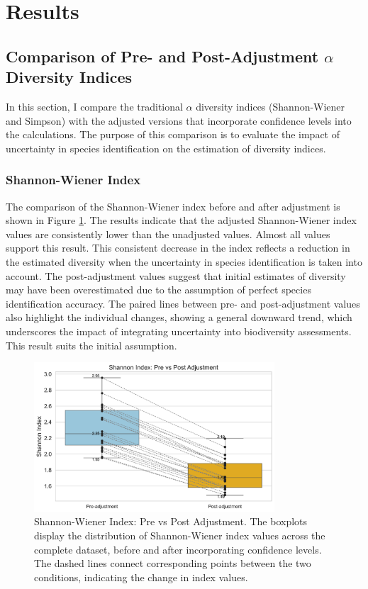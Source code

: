 \documentclass[a4paper,12pt]{article}
\begin{document}
\section{Results}

\subsection{Comparison of Pre- and Post-Adjustment $\alpha$ Diversity Indices}

In this section, I compare the traditional $\alpha$ diversity indices (Shannon-Wiener and Simpson) with the adjusted versions that incorporate confidence levels into the calculations. The purpose of this comparison is to evaluate the impact of uncertainty in species identification on the estimation of diversity indices.


\subsubsection{Shannon-Wiener Index}
The comparison of the Shannon-Wiener index before and after adjustment is shown in Figure \ref{fig:shannon}. The results indicate that the adjusted Shannon-Wiener index values are consistently lower than the unadjusted values. Almost all values support this result. This consistent decrease in the index reflects a reduction in the estimated diversity when the uncertainty in species identification is taken into account. The post-adjustment values suggest that initial estimates of diversity may have been overestimated due to the assumption of perfect species identification accuracy. The paired lines between pre- and post-adjustment values also highlight the individual changes, showing a general downward trend, which underscores the impact of integrating uncertainty into biodiversity assessments. This result suits the initial assumption.

\begin{figure}[H]
\centering
\includegraphics[width=0.8\textwidth]{Figures/shannon.png}
\caption{Shannon-Wiener Index: Pre vs Post Adjustment. The boxplots display the distribution of Shannon-Wiener index values across the complete dataset, before and after incorporating confidence levels. The dashed lines connect corresponding points between the two conditions, indicating the change in index values.}
\label{fig:shannon}
\end{figure}
\end{document}
